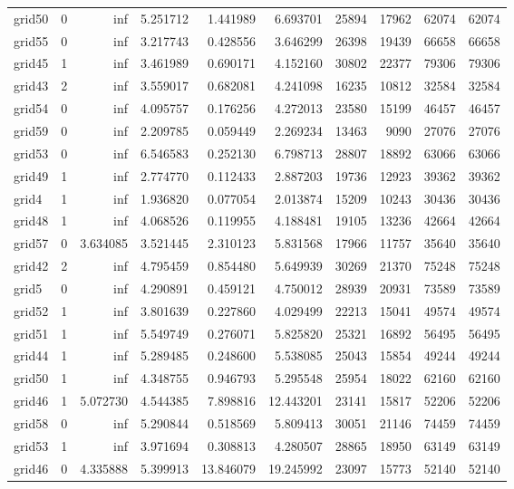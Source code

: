 \begin{longtable}{|l|r|r|r|r|r|r|r|r|r|}
grid50 & 0 & inf & 5.251712 & 1.441989 & 6.693701 & 25894 & 17962 & 62074 & 62074 \\
grid55 & 0 & inf & 3.217743 & 0.428556 & 3.646299 & 26398 & 19439 & 66658 & 66658 \\
grid45 & 1 & inf & 3.461989 & 0.690171 & 4.152160 & 30802 & 22377 & 79306 & 79306 \\
grid43 & 2 & inf & 3.559017 & 0.682081 & 4.241098 & 16235 & 10812 & 32584 & 32584 \\
grid54 & 0 & inf & 4.095757 & 0.176256 & 4.272013 & 23580 & 15199 & 46457 & 46457 \\
grid59 & 0 & inf & 2.209785 & 0.059449 & 2.269234 & 13463 & 9090 & 27076 & 27076 \\
grid53 & 0 & inf & 6.546583 & 0.252130 & 6.798713 & 28807 & 18892 & 63066 & 63066 \\
grid49 & 1 & inf & 2.774770 & 0.112433 & 2.887203 & 19736 & 12923 & 39362 & 39362 \\
grid4 & 1 & inf & 1.936820 & 0.077054 & 2.013874 & 15209 & 10243 & 30436 & 30436 \\
grid48 & 1 & inf & 4.068526 & 0.119955 & 4.188481 & 19105 & 13236 & 42664 & 42664 \\
grid57 & 0 & 3.634085 & 3.521445 & 2.310123 & 5.831568 & 17966 & 11757 & 35640 & 35640 \\
grid42 & 2 & inf & 4.795459 & 0.854480 & 5.649939 & 30269 & 21370 & 75248 & 75248 \\
grid5 & 0 & inf & 4.290891 & 0.459121 & 4.750012 & 28939 & 20931 & 73589 & 73589 \\
grid52 & 1 & inf & 3.801639 & 0.227860 & 4.029499 & 22213 & 15041 & 49574 & 49574 \\
grid51 & 1 & inf & 5.549749 & 0.276071 & 5.825820 & 25321 & 16892 & 56495 & 56495 \\
grid44 & 1 & inf & 5.289485 & 0.248600 & 5.538085 & 25043 & 15854 & 49244 & 49244 \\
grid50 & 1 & inf & 4.348755 & 0.946793 & 5.295548 & 25954 & 18022 & 62160 & 62160 \\
grid46 & 1 & 5.072730 & 4.544385 & 7.898816 & 12.443201 & 23141 & 15817 & 52206 & 52206 \\
grid58 & 0 & inf & 5.290844 & 0.518569 & 5.809413 & 30051 & 21146 & 74459 & 74459 \\
grid53 & 1 & inf & 3.971694 & 0.308813 & 4.280507 & 28865 & 18950 & 63149 & 63149 \\
grid46 & 0 & 4.335888 & 5.399913 & 13.846079 & 19.245992 & 23097 & 15773 & 52140 & 52140 \\

\end{longtable}
